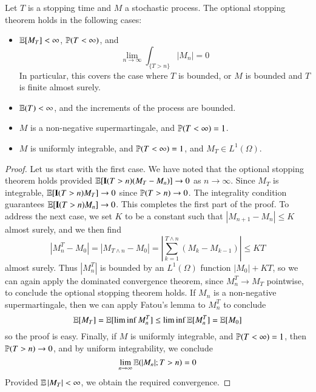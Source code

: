 \begin{theorem}
    Let $T$ is a stopping time and $M$ a stochastic process. The optional stopping theorem holds in the following cases:
    \begin{itemize}
        \item $\operatorname{\mathbb{E}}[M_T] < \infty$, $\operatorname{\mathbb{P}}(T < \infty)$, and
        \[ \lim_{n \to \infty} \int_{\{ T > n \}} |M_n| = 0 \]
        In particular, this covers the case where $T$ is bounded, or $M$ is bounded and $T$ is finite almost surely.

        \item $\operatorname{\mathbb{E}}(T) < \infty$, and the increments of the process are bounded.

        \item $M$ is a non-negative supermartingale, and $\operatorname{\mathbb{P}}(T < \infty) = 1$.

        \item $M$ is uniformly integrable, and $\operatorname{\mathbb{P}}(T < \infty) = 1$, and $M_T \in L^1(\Omega)$.
    \end{itemize}
\end{theorem}
\begin{proof}
    Let us start with the first case. We have noted that the optional stopping theorem holds provided $\operatorname{\mathbb{E}}[\mathbf{I}(T > n)(M_T - M_n)] \to 0$ as $n \to \infty$. Since $M_T$ is integrable, $\operatorname{\mathbb{E}}[\mathbf{I}(T > n) M_T] \to 0$ since $\operatorname{\mathbb{P}}(T > n) \to 0$. The integrality condition guarantees $\operatorname{\mathbb{E}}[\mathbf{I}(T > n) M_n] \to 0$. This completes the first part of the proof. To address the next case, we set $K$ to be a constant such that $|M_{n+1} - M_n| \leq K$ almost surely, and we then find
    \[ |M^T_n - M_0| = |M_{T \wedge n} - M_0| = \left| \sum_{k = 1}^{T \wedge n} (M_k - M_{k-1}) \right| \leq KT \]
    almost surely. Thus $|M^T_n|$ is bounded by an $L^1(\Omega)$ function $|M_0| + KT$, so we can again apply the dominated convergence theorem, since $M^T_n \to M_T$ pointwise, to conclude the optional stopping theorem holds. If $M_n$ is a non-negative supermartingale, then we can apply Fatou's lemma to $M_n^T$ to conclude
    \[ \operatorname{\mathbb{E}}[M_T] = \operatorname{\mathbb{E}}[\liminf M_n^T] \leq \liminf \operatorname{\mathbb{E}}[M_n^T] = \operatorname{\mathbb{E}}[M_0] \]
    so the proof is easy. Finally, if $M$ is uniformly integrable, and $\operatorname{\mathbb{P}}(T < \infty) = 1$, then $\operatorname{\mathbb{P}}(T > n) \to 0$, and by uniform integrability, we conclude
    \[ \lim_{n \to \infty} \operatorname{\mathbb{E}}(|M_n|; T > n) = 0 \]
    Provided $\operatorname{\mathbb{E}}|M_T| < \infty$, we obtain the required convergence.
\end{proof}

